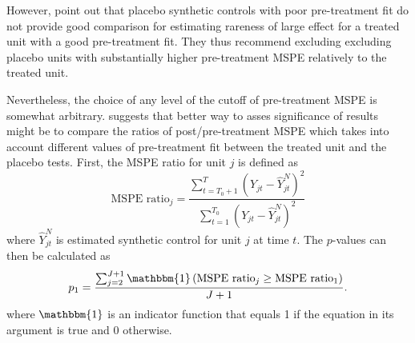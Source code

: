 
However, \citet{abadie_synthetic_2010}  point out that placebo synthetic controls with poor pre-treatment fit do not provide good comparison for estimating rareness of large effect for a treated unit with a good  pre-treatment fit. They thus recommend excluding excluding placebo units with substantially higher pre-treatment MSPE relatively to the treated unit. 

Nevertheless, the choice of any level of the cutoff of pre-treatment MSPE is somewhat arbitrary. \citet{abadie_synthetic_2010} suggests that  better way to asses significance of results might be to compare the ratios of post/pre-treatment MSPE which
takes into account different values of pre-treatment fit between the treated unit and the placebo tests. First, the  MSPE ratio for unit $j$ is defined as
\begin{equation} \label{eq:mspe_ratio}
\text{MSPE ratio}_j = \frac{\sum_{t = T_0 + 1}^{T} \left( Y_{jt} -  \hat Y_{jt}^N\right)^2}{\sum_{t = 1}^{T_0} \left( Y_{jt} -  \hat Y_{jt}^N\right)^2} 
\end{equation}
where $\hat Y_{jt}^N$ is estimated synthetic control for unit $j$ at time $t$. 
The  $p$-values can then be calculated as 
\begin{equation} \label{eq:p_ratio}
 p_1   = \frac{\sum_{j = 2}^{J + 1} \mathbbm{1}\left( \text{MSPE ratio}_{j} \geq \text{MSPE ratio}_{1} \right)}{J + 1}.
\end{equation}
where $\mathbbm{1}$ is an indicator function that equals 1 if the equation in its argument is true and 0 otherwise. 





